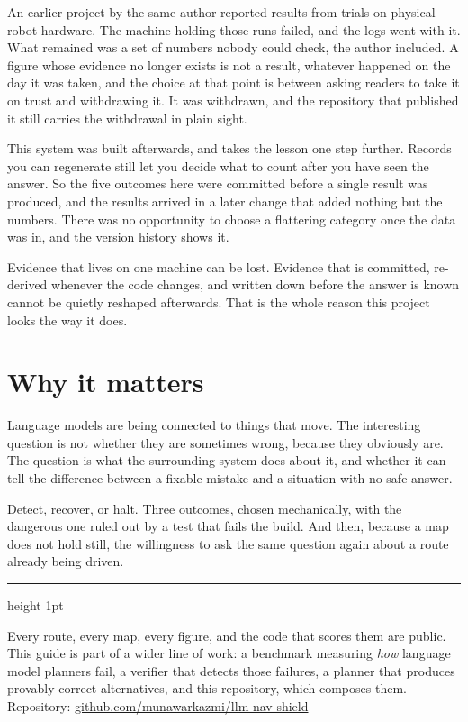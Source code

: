\documentclass[11pt,a4paper]{article}
\begin{document}
An earlier project by the same author reported results from trials on physical robot hardware. The machine holding those runs failed, and the logs went with it. What remained was a set of numbers nobody could check, the author included. A figure whose evidence no longer exists is not a result, whatever happened on the day it was taken, and the choice at that point is between asking readers to take it on trust and withdrawing it. It was withdrawn, and the repository that published it still carries the withdrawal in plain sight.

This system was built afterwards, and takes the lesson one step further. Records you can regenerate still let you decide what to count after you have seen the answer. So the five outcomes here were committed before a single result was produced, and the results arrived in a later change that added nothing but the numbers. There was no opportunity to choose a flattering category once the data was in, and the version history shows it.

\begin{quotebox}
Evidence that lives on one machine can be lost. Evidence that is committed, re-derived whenever the code changes, and written down before the answer is known cannot be quietly reshaped afterwards. That is the whole reason this project looks the way it does.
\end{quotebox}

\section{Why it matters}

Language models are being connected to things that move. The interesting question is not whether they are sometimes wrong, because they obviously are. The question is what the surrounding system does about it, and whether it can tell the difference between a fixable mistake and a situation with no safe answer.

Detect, recover, or halt. Three outcomes, chosen mechanically, with the dangerous one ruled out by a test that fails the build. And then, because a map does not hold still, the willingness to ask the same question again about a route already being driven.

\vspace{6pt}
{\color{rule}\hrule height 1pt}
\vspace{6pt}

{\small Every route, every map, every figure, and the code that scores them are public. This guide is part of a wider line of work: a benchmark measuring \emph{how} language model planners fail, a verifier that detects those failures, a planner that produces provably correct alternatives, and this repository, which composes them.\\
Repository: \href{https://github.com/munawarkazmi/llm-nav-shield}{github.com/munawarkazmi/llm-nav-shield}}
\end{document}
